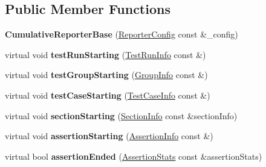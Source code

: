 \subsection*{Public Member Functions}
\begin{DoxyCompactItemize}
\item 
{\bfseries Cumulative\+Reporter\+Base} (\hyperlink{structCatch_1_1ReporterConfig}{Reporter\+Config} const \&\+\_\+config)\hypertarget{structCatch_1_1CumulativeReporterBase_ae25c7146268ae81fa0f944481d7ea5a5}{}\label{structCatch_1_1CumulativeReporterBase_ae25c7146268ae81fa0f944481d7ea5a5}

\item 
virtual void {\bfseries test\+Run\+Starting} (\hyperlink{structCatch_1_1TestRunInfo}{Test\+Run\+Info} const \&)\hypertarget{structCatch_1_1CumulativeReporterBase_a6326c26db277590f1d261953fd4b6733}{}\label{structCatch_1_1CumulativeReporterBase_a6326c26db277590f1d261953fd4b6733}

\item 
virtual void {\bfseries test\+Group\+Starting} (\hyperlink{structCatch_1_1GroupInfo}{Group\+Info} const \&)\hypertarget{structCatch_1_1CumulativeReporterBase_a43f07792f2de8dce50ac0a24dbda6f5a}{}\label{structCatch_1_1CumulativeReporterBase_a43f07792f2de8dce50ac0a24dbda6f5a}

\item 
virtual void {\bfseries test\+Case\+Starting} (\hyperlink{structCatch_1_1TestCaseInfo}{Test\+Case\+Info} const \&)\hypertarget{structCatch_1_1CumulativeReporterBase_affa61c6fb32e28a388afa45aa492c265}{}\label{structCatch_1_1CumulativeReporterBase_affa61c6fb32e28a388afa45aa492c265}

\item 
virtual void {\bfseries section\+Starting} (\hyperlink{structCatch_1_1SectionInfo}{Section\+Info} const \&section\+Info)\hypertarget{structCatch_1_1CumulativeReporterBase_a65bfe4710217c2d3eed5efe389adcd77}{}\label{structCatch_1_1CumulativeReporterBase_a65bfe4710217c2d3eed5efe389adcd77}

\item 
virtual void {\bfseries assertion\+Starting} (\hyperlink{structCatch_1_1AssertionInfo}{Assertion\+Info} const \&)\hypertarget{structCatch_1_1CumulativeReporterBase_a7b5dfe0f0597083e686066ce7aeaaf35}{}\label{structCatch_1_1CumulativeReporterBase_a7b5dfe0f0597083e686066ce7aeaaf35}

\item 
virtual bool {\bfseries assertion\+Ended} (\hyperlink{structCatch_1_1AssertionStats}{Assertion\+Stats} const \&assertion\+Stats)\hypertarget{structCatch_1_1CumulativeReporterBase_a22c7dfc613e911f97c621e436cde016c}{}\label{structCatch_1_1CumulativeReporterBase_a22c7dfc613e911f97c621e436cde016c}


\end{DoxyCompactItemize}
